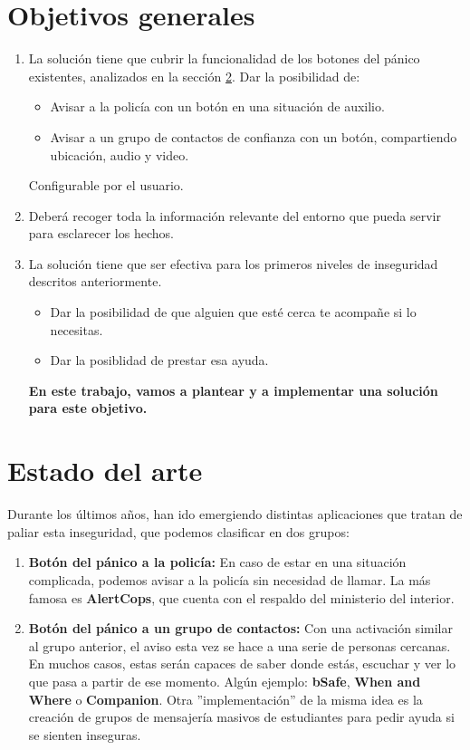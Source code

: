 \section{Objetivos generales}\label{sec:obj}
\begin{enumerate}
  \item La solución tiene que cubrir la funcionalidad de los botones del pánico existentes, analizados en la sección \ref{sec:art}.
  Dar la posibilidad de: 
  \begin{itemize}
    \item Avisar a la policía con un botón en una situación de auxilio.
    \item Avisar a un grupo de contactos de confianza con un botón, compartiendo ubicación, audio y video.
  \end{itemize}
  Configurable por el usuario.
  \item Deberá recoger toda la información relevante del entorno que pueda servir para esclarecer los hechos.
  \item La solución tiene que ser efectiva para los primeros niveles de inseguridad descritos anteriormente.
  \begin{itemize}
    \item Dar la posibilidad de que alguien que esté cerca te acompañe si lo necesitas.
    \item Dar la posiblidad de prestar esa ayuda.
  \end{itemize}
\textbf{En este trabajo, vamos a plantear y a implementar una solución para este objetivo.}
\end{enumerate}

\section{Estado del arte}\label{sec:art}
Durante los últimos años, han ido emergiendo distintas aplicaciones que tratan de paliar esta inseguridad, que podemos clasificar en dos grupos:
\begin{enumerate}
\item \textbf{Botón del pánico a la policía:} En caso de estar en una situación complicada, podemos avisar a la policía sin necesidad de llamar. La más famosa es \textbf{AlertCops}, que cuenta con el respaldo del ministerio del interior.
\item \textbf{Botón del pánico a un grupo de contactos:} Con una activación similar al grupo anterior, el aviso esta vez se hace a una serie de personas cercanas. En muchos casos, estas serán capaces de saber donde estás, escuchar y ver lo que pasa a partir de ese momento. Algún ejemplo: \textbf{bSafe}, \textbf{When and Where} o \textbf{Companion}.
Otra ''implementación'' de la misma idea es la creación de grupos de mensajería masivos de estudiantes para pedir ayuda si se sienten inseguras.
\end{enumerate}

